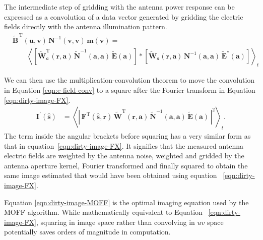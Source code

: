 \documentclass[a4paper,fleqn,usenatbib]{mnras}
\begin{document}
The intermediate step of gridding with the antenna power response can be 
expressed as a convolution of a data vector generated by gridding the electric fields 
directly with the antenna illumination pattern.
\begin{align}
&\widetilde{\mathbf{B}}^{\,\textrm{T}}(\mathbf{u},\mathbf{v})\,\mathbf{N}^{-1}(\mathbf{v} ,\mathbf{v})\,\mathbf{m}(\mathbf{v})=\nonumber\\
&\qquad\left\langle \left[\widetilde{\mathbf{W}}^\textrm{T}_a(\mathbf{r},\mathbf{a})\, \widetilde{\mathbf{N}}^{-1}\!(\mathbf{a},\mathbf{a})\, \widetilde{\mathbf{E}}(\mathbf{a})\right]
\ast\left[\widetilde{\mathbf{W}}_a(\mathbf{r},\mathbf{a})\, \mathbf{N}^{-1}\!(\mathbf{a},\mathbf{a})\, \widetilde{\mathbf{E}}^\star(\mathbf{a})\right]\right\rangle_t\label{eqn:e-field-conv}
\end{align}

We can then use the multiplication-convolution theorem to move the convolution in 
Equation \ref{eqn:e-field-conv} to a square after the Fourier transform in Equation 
\ref{eqn:dirty-image-FX}.
\begin{align}
  \mathbf{I}^\prime(\hat{\mathbf{s}}) &= \left\langle \left|\,\mathbf{F}^\textrm{T}(\hat{\mathbf{s}},\mathbf{r})\,\widetilde{\mathbf{W}}^\textrm{T}(\mathbf{r},\mathbf{a})\,\widetilde{\mathbf{N}}^{-1}(\mathbf{a},\mathbf{a})\,\widetilde{\mathbf{E}}(\mathbf{a})\,\right|^2\right\rangle_t. \label{eqn:dirty-image-MOFF}
\end{align}
The term inside the angular brackets before squaring has a very similar form as
that in equation~\ref{eqn:dirty-image-FX}. It signifies that the measured antenna
electric fields are weighted by the antenna noise, weighted and gridded by the
antenna aperture kernel, Fourier transformed and finally squared to obtain the
same image estimated that would have been obtained using equation~
\ref{eqn:dirty-image-FX}. 

Equation \ref{eqn:dirty-image-MOFF} is the optimal imaging equation used by the 
MOFF algorithm. While mathematically equivalent to Equation~
\ref{eqn:dirty-image-FX}, squaring in image space rather than convolving in $uv$ 
space potentially saves orders of magnitude in computation.
\end{document}
